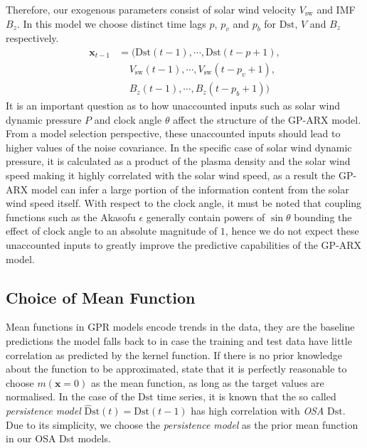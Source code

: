 Therefore, our exogenous parameters consist of solar wind velocity $ V_{\text{sw}}$ and IMF $B_z$. 
In this model we choose distinct time lags $p$, $p_{v}$ and $p_{b}$ for $\mathrm{Dst}$, $V$ and 
$B_z$ respectively.
%
\begin{align*}
       \mathbf{x}_{t-1} & = (\mathrm{Dst}(t-1), \cdots , \mathrm{Dst}(t-p+1), \\
        & \ \ \ \ \  V_{\text{sw}}(t-1), \cdots, V_{\text{sw}}(t-p_{v}+1),\\
        & \ \ \ \ \  B_{z}(t-1), \cdots, B_{z}(t-p_{b}+1))
\end{align*}
%
It is an important question as to how unaccounted inputs such as solar wind dynamic pressure $P$ 
and clock angle $\theta$ affect the structure of the GP-ARX model. From a model selection 
perspective, these unaccounted inputs should lead to higher values of the noise covariance. In the 
specific case of solar wind dynamic pressure, it is calculated as a product of the plasma density 
and the solar wind speed making it highly correlated with the solar wind speed, as a result the 
GP-ARX model can infer a large portion of the information content from the solar wind speed itself. 
With respect to the clock angle, it must be noted that coupling functions such as the Akasofu 
$\epsilon$ generally contain powers of $\sin \theta$ bounding the effect of clock angle to an 
absolute magnitude of $1$, hence we do not expect these unaccounted inputs to greatly improve the 
predictive capabilities of the GP-ARX model.

\subsection{Choice of Mean Function}

Mean functions in GPR models encode trends in the data, they are the baseline predictions the model 
falls back to in case the training and test data have little correlation as predicted by the kernel 
function. If there is no prior knowledge about the function to be approximated, 
\citet{Rasmussen:2005:GPM:1162254} state that it is perfectly reasonable to choose 
$m(\mathbf{x} = 0)$ as the mean function, as long as the target values are normalised. In the case 
of the $\mathrm{Dst}$ time series, it is known that the so called \emph{persistence model} 
$\mathrm{\hat{D}st}(t) = \mathrm{Dst}(t-1)$ has high correlation with \emph{OSA} $\mathrm{Dst}$. 
Due to its simplicity, we choose the \emph{persistence model} as the prior mean function in our 
OSA Dst models. 

